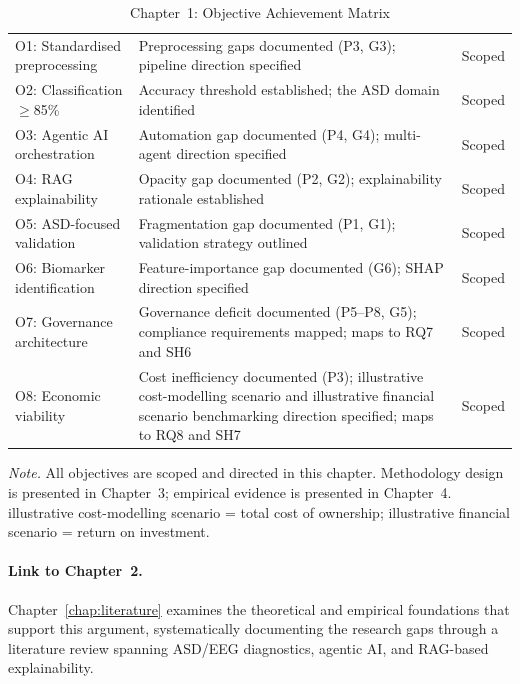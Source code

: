 {\tablestripes\tablefontsize
{}
\begin{xltabular}{\textwidth}{@{} >{\raggedright\arraybackslash}p{4.4cm} p{7.8cm} >{\raggedright\arraybackslash}p{2.2cm} @{}}
\caption[Chapter 1 objective achievement]{Chapter~1: Objective Achievement Matrix}\label{tab:ch1_kit_objectives} \\
\toprule
{} &  &  \\
\midrule
\endfirsthead
\endhead
\bottomrule
\endlastfoot
O1: Standardised preprocessing & Preprocessing gaps documented (P3, G3); pipeline direction specified & Scoped \\
O2: Classification $\geq$85\% & Accuracy threshold established; the ASD domain identified & Scoped \\
O3: Agentic AI orchestration & Automation gap documented (P4, G4); multi-agent direction specified & Scoped \\
O4: RAG explainability & Opacity gap documented (P2, G2); explainability rationale established & Scoped \\
O5: ASD-focused validation & Fragmentation gap documented (P1, G1); validation strategy outlined & Scoped \\
O6: Biomarker identification & Feature-importance gap documented (G6); SHAP direction specified & Scoped \\
O7: Governance architecture & Governance deficit documented (P5--P8, G5); compliance requirements mapped; maps to RQ7 and SH6 & Scoped \\
\addlinespace
O8: Economic viability & Cost inefficiency documented (P3); illustrative cost-modelling scenario and illustrative financial scenario benchmarking direction specified; maps to RQ8 and SH7 & Scoped \\
\end{xltabular}}
\vspace{0.5em}
\noindent\textit{Note.} All objectives are scoped and directed in this chapter. Methodology design is presented in Chapter~3; empirical evidence is presented in Chapter~4. illustrative cost-modelling scenario = total cost of ownership; illustrative financial scenario = return on investment.
\fi %

\label{tab:ch1_kit_objectives}

\paragraph{Link to Chapter~2.}
Chapter~\ref{chap:literature} examines the theoretical and empirical foundations that support this argument, systematically documenting the research gaps through a literature review spanning ASD/EEG diagnostics, agentic AI, and RAG-based explainability.

